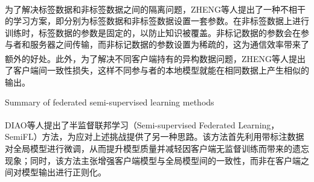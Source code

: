 为了解决标签数据和非标签数据之间的隔离问题，ZHENG\textsuperscript{\cite{jeong2020federated}}等人提出了一种不相干的学习方案，即分别为标签数据和非标签数据设置一套参数。在非标签数据上进行训练时，标签数据的参数是固定的，以防止知识被覆盖。非标记数据的参数会在参与者和服务器之间传输，而非标记数据的参数设置为稀疏的，这为通信效率带来了额外的好处。此外，为了解决不同客户端持有的异构数据问题，ZHENG\textsuperscript{\cite{jeong2020federated}}等人提出了客户端间一致性损失，这样不同参与者的本地模型就能在相同数据上产生相似的输出。

\begin{table}[h]
	\centering
	{\songti \wuhao Summary of federated semi-supervised learning methods}
	\label{SummaryOfFedSemi}
\end{table}
\vspace{-0.35cm}

DIAO\textsuperscript{\cite{diao2022semifl}}等人提出了半监督联邦学习（Semi-supervised Federated Learning，SemiFL）方法，为应对上述挑战提供了另一种思路。该方法首先利用带标注数据对全局模型进行微调，从而提升模型质量并减轻因客户端无监督训练而带来的遗忘现象；同时，该方法主张增强客户端模型与全局模型间的一致性，而非在客户端之间对模型输出进行正则化。

